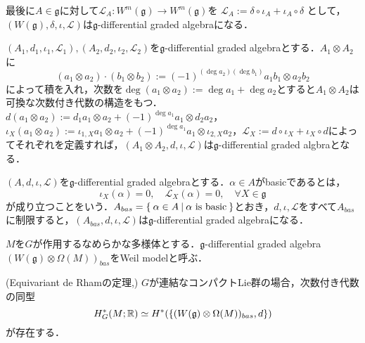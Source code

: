 \begin{eg}
最後に$A\in\mathfrak{g}$に対して$\mathcal{L}_A\colon W^m(\mathfrak{g})\rightarrow W^m(\mathfrak{g})$を
$
\mathcal{L}_A:=\delta\circ\iota_A + \iota_A\circ\delta
$
として，$(W(\mathfrak{g}),\delta,\iota,\mathcal{L})$は$\mathfrak{g}$-differential graded algebraになる．
\end{eg}

\begin{eg}\label{tonsor of g-dga}
  $(A_1,d_1,\iota_1,\mathcal{L}_1),(A_2,d_2,\iota_2,\mathcal{L}_2)$を$\mathfrak{g}$-differential graded algebraとする．$A_1\otimes A_2$に
  \[
  (a_1\otimes a_2)\cdot (b_1\otimes b_2):=(-1)^{(\deg a_2)(\deg b_1)}a_1b_1\otimes a_2b_2
  \]
  によって積を入れ，次数を$\deg(a_1\otimes a_2) := \deg a_1 + \deg a_2$とすると$A_1\otimes A_2$は可換な次数付き代数の構造をもつ．
  $d(a_1\otimes a_2) := d_1a_1\otimes a_2 + (-1)^{\deg a_1}a_1\otimes d_2a_2$，$\iota_X(a_1\otimes a_2) := \iota_{1,X}a_1\otimes a_2 + (-1)^{\deg a_1}a_1\otimes\iota_{2,X}a_2$，$\mathcal{L}_X := d\circ \iota_X + \iota_X \circ d$によってそれぞれを定義すれば，$(A_1\otimes A_2,d,\iota,\mathcal{L})$は$\mathfrak{g}$-differential graded algbraとなる．
\end{eg}

\begin{defin}
  $(A,d,\iota,\mathcal{L})$を$\mathfrak{g}$-differential graded algebraとする．$\alpha\in A$がbasicであるとは，
  \[
  \iota_X(\alpha) = 0,\quad\mathcal{L}_X(\alpha) = 0,\quad \forall X\in\mathfrak{g}
  \]
  が成り立つことをいう．$A_{bas}=\left\{\:\alpha\in A\:\middle|\:\alpha\text{ is basic}\:\right\}$とおき，$d,\iota,\mathcal{L}$をすべて$A_{bas}$に制限すると，$(A_{bas},d,\iota,\mathcal{L})$は$\mathfrak{g}$-differential graded algebraになる．
\end{defin}

\begin{defin}
  $M$を$G$が作用するなめらかな多様体とする．$\mathfrak{g}$-differential graded algebra $(W(\mathfrak{g})\otimes\Omega(M))_{bas}$をWeil modelと呼ぶ．
\end{defin}

\begin{theo}(Equivariant de Rhamの定理\cite{cartan1},\cite{cartan2})
  $G$が連結なコンパクトLie群の場合，次数付き代数の同型
  \[
  H^*_G(M;\mathbb{R})\simeq H^*(\{(W(\mathfrak{g})\otimes\Omega(M))_{bas},d\})
  \]
  が存在する．
\end{theo}

